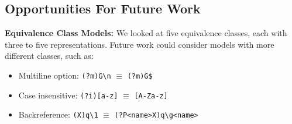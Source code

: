 %
%

\subsection{Opportunities For Future Work}
\label{sec:futureequivclasses}
%
\noindent \textbf{Equivalence Class Models:}
We looked at five equivalence classes, each with three to five representations.
Future work could consider models with more different classes, such as:
%
\begin{itemize} %
\item Multiline option: { \verb!(?m)G\n! $\equiv$ \verb!(?m)G$!}
\item Case insensitive: { \verb!(?i)[a-z]! $\equiv$ \verb![A-Za-z]!}
\item Backreference: { \verb!(X)q\1! $\equiv$ \verb!(?P<name>X)q\g<name>!}
\end{itemize}

